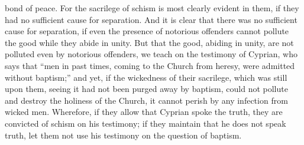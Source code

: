 bond of peace. For the sacrilege of schism is most clearly evident in them, if they had no sufficient cause for separation. And it is clear that there was no sufficient cause for separation, if even the presence of notorious offenders cannot pollute the good while they abide in unity. But that the good, abiding in unity, are not polluted even by notorious offenders, we teach on the testimony of Cyprian, who says that ``men in past times, coming to the Church from heresy, were admitted without baptism;'' and yet, if the wickedness of their sacrilege, which was still upon them, seeing it had not been purged away by baptism, could not pollute and destroy the holiness of the Church, it cannot perish by any infection from wicked men. Wherefore, if they allow that Cyprian spoke the truth, they are convicted of schism on his testimony; if they maintain that he does not speak truth, let them not use his testimony on the question of baptism.


